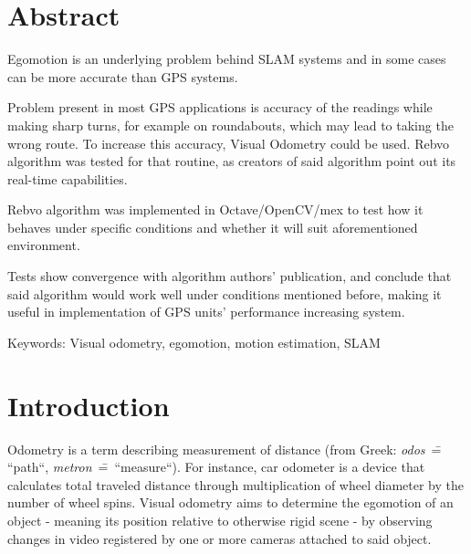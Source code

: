 \chapter*{Abstract}

Egomotion is an underlying problem behind SLAM systems and in some cases can be more accurate than GPS systems.

Problem present in most GPS applications is accuracy of the readings while making sharp turns, for example on roundabouts, which may lead to taking the wrong route. To increase this accuracy, Visual Odometry could be used. Rebvo algorithm was tested for that routine, as creators of said algorithm point out its real-time capabilities.

Rebvo algorithm was implemented in Octave/OpenCV/mex to test how it behaves under specific conditions and whether it will suit aforementioned environment.

Tests show convergence with algorithm authors' publication, and conclude that said algorithm would work well under conditions mentioned before, making it useful in implementation of GPS units' performance increasing system.

Keywords: Visual odometry, egomotion, motion estimation, SLAM

\chapter*{Introduction}

Odometry is a term describing measurement of distance (from Greek: \textit{odos}~\==~ ``path``, \textit{metron}~\==~``measure``). For instance, car odometer is a device that calculates total traveled distance through multiplication of wheel diameter by the number of wheel spins. %
Visual odometry aims to determine the egomotion of an object - meaning its position relative to otherwise rigid scene - by observing changes in video registered by one or more cameras attached to said object.

